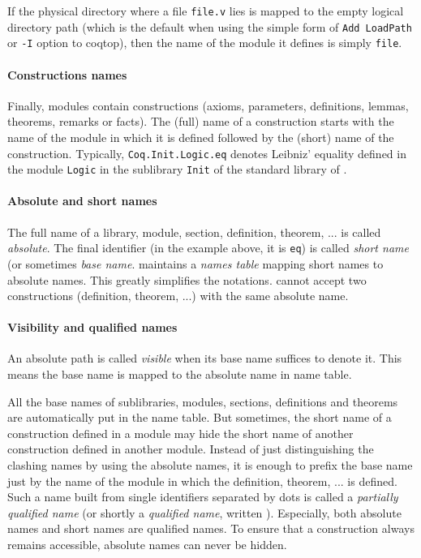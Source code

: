 {\begin{coq_example}
If the physical directory where a file {\tt file.v} lies is mapped to
the empty logical directory path (which is the default when using the
simple form of {\tt Add LoadPath} or {\tt -I} option to coqtop), then
the name of the module it defines is simply {\tt file}.

\paragraph{Constructions names}

Finally, modules contain constructions (axioms, parameters,
definitions, lemmas, theorems, remarks or facts). The (full) name of a
construction starts with the name of the module in which it is defined
followed by the (short) name of the construction.
Typically, {\tt Coq.Init.Logic.eq} denotes Leibniz' equality
defined in the module {\tt Logic} in the sublibrary {\tt Init} of the
standard library of \Coq.

\paragraph{Absolute and short names}

The full name of a library, module, section, definition, theorem,
... is called {\it absolute}. 
The final identifier (in the example
above, it is {\tt eq}) is called {\it short name} (or sometimes {\it
base name}.  {\Coq} maintains a {\it names table} mapping short names
to absolute names. This greatly simplifies the notations.  {\Coq}
cannot accept two constructions (definition, theorem, ...) with the
same absolute name.

\paragraph{Visibility and qualified names}
An absolute path is called {\it visible} when its base name suffices
to denote it. This means the base name is mapped to the absolute name
in {\Coq} name table.

All the base names of sublibraries, modules, sections, definitions and
theorems are automatically put in the {\Coq} name table. But
sometimes, the short name of a construction defined in a module may
hide the short name of another construction defined in another module.
Instead of just distinguishing the clashing names by using the
absolute names, it is enough to prefix the base name just by the name
of the module in which the definition, theorem, ... is defined.
Such a name built from single identifiers separated by dots is called
a {\em partially qualified name} (or shortly a {\em qualified name},
written {\qualid}). Especially, both absolute names and short names
are qualified names. To ensure that a construction always remains
accessible, absolute names can never be hidden.


\end{coq_example}}
